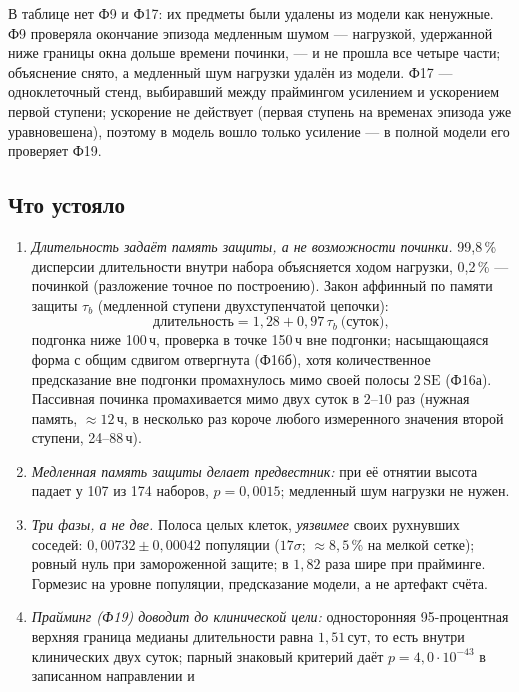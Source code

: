 \documentclass[11pt,a4paper]{article}
\theoremstyle{remark}
\begin{document}
В таблице нет Ф9 и Ф17: их предметы были удалены из модели как ненужные. Ф9 проверяла
окончание эпизода медленным шумом --- нагрузкой, удержанной ниже границы окна дольше
времени починки, --- и не прошла все четыре части; объяснение снято, а медленный шум
нагрузки удалён из модели. Ф17 --- одноклеточный стенд, выбиравший между праймингом
усилением и ускорением первой ступени; ускорение не действует (первая ступень на
временах эпизода уже уравновешена), поэтому в модель вошло только усиление --- в полной
модели его проверяет Ф19.

\subsection{Что устояло}\label{sec:survived}
\begin{enumerate}[leftmargin=1.2em]
\item \emph{Длительность задаёт память защиты, а не возможности починки.} 99{,}8\,\%
дисперсии длительности внутри набора объясняется ходом нагрузки, 0{,}2\,\% ---
починкой (разложение точное по построению). Закон аффинный по памяти защиты $\tau_b$ (медленной ступени
двухступенчатой цепочки):
\begin{equation}\label{eq:dur}
\text{длительность}=1{,}28+0{,}97\,\tau_b\ \text{(суток)},
\end{equation}
подгонка ниже 100\,ч, проверка в точке 150\,ч вне подгонки; насыщающаяся форма с
общим сдвигом отвергнута (Ф16б), хотя количественное предсказание вне подгонки
промахнулось мимо своей полосы $2\,\mathrm{SE}$ (Ф16а). Пассивная починка
промахивается мимо двух суток в $2$--$10$ раз (нужная память, $\approx12$\,ч, в
несколько раз короче любого измеренного значения второй ступени, 24--88\,ч).
\item \emph{Медленная память защиты делает предвестник:} при её отнятии высота падает
у 107 из 174 наборов, $p=0{,}0015$; медленный шум нагрузки не нужен.
\item \emph{Три фазы, а не две.} Полоса целых клеток, \emph{уязвимее} своих рухнувших
соседей: $0{,}00732\pm0{,}00042$ популяции ($17\sigma$; $\approx8{,}5$\,\% на мелкой
сетке); ровный нуль при замороженной защите; в $1{,}82$ раза шире при прайминге.
Гормезис на уровне популяции, предсказание модели, а не артефакт счёта.
\item \emph{Прайминг (Ф19) доводит до клинической цели:} односторонняя 95-процентная верхняя
граница медианы длительности равна $1{,}51$\,сут, то есть внутри клинических двух суток;
парный знаковый критерий даёт $p=4{,}0\cdot10^{-43}$ в записанном направлении и

\end{enumerate}
\end{document}
